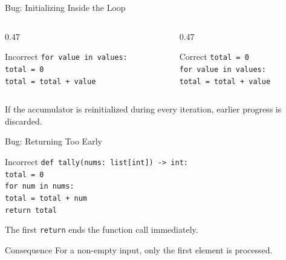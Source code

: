 \documentclass[aspectratio=169,10pt]{beamer}
\begin{document}
\begin{frame}{Bug: Initializing Inside the Loop}
  \begin{columns}[T,onlytextwidth]
    \begin{column}{0.47\textwidth}
      \begin{block}{Incorrect}
        \texttt{for value in values:}\\
        \hspace{0.18in}\texttt{total = 0}\\
        \hspace{0.18in}\texttt{total = total + value}
      \end{block}
    \end{column}
    \begin{column}{0.47\textwidth}
      \begin{block}{Correct}
        \texttt{total = 0}\\
        \texttt{for value in values:}\\
        \hspace{0.18in}\texttt{total = total + value}
      \end{block}
    \end{column}
  \end{columns}

  \begin{keyidea}
    If the accumulator is reinitialized during every iteration, earlier progress is discarded.
  \end{keyidea}
\end{frame}

\begin{frame}{Bug: Returning Too Early}
  \begin{block}{Incorrect}
    \texttt{def tally(nums: list[int]) -> int:}\\
    \hspace{0.20in}\texttt{total = 0}\\
    \hspace{0.20in}\texttt{for num in nums:}\\
    \hspace{0.40in}\texttt{total = total + num}\\
    \hspace{0.40in}\texttt{return total}
  \end{block}

  The first \texttt{return} ends the function call immediately.

  \begin{alertblock}{Consequence}
    For a non-empty input, only the first element is processed.
  \end{alertblock}
\end{frame}
\end{document}
